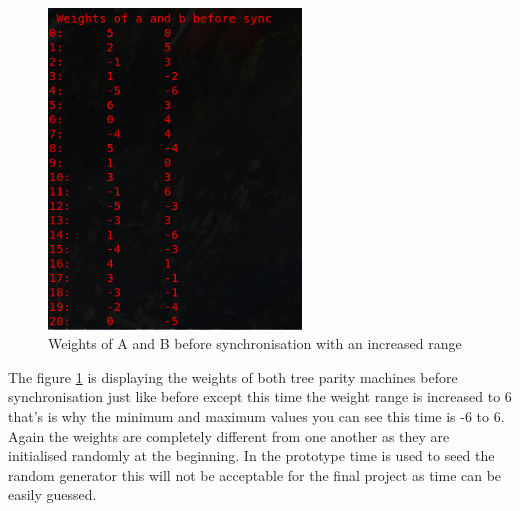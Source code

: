 \begin{figure}[!h]
  \centering
      \includegraphics[width=0.6\textwidth]{Figures/proto9.png}
  \caption[Weights of A and B before synchronisation with an increased range]{Weights of A and B before synchronisation with an increased range}
  \label{fig:prototype9}
\end{figure}
\FloatBarrier
The figure \ref{fig:prototype9} is displaying the weights of both tree parity machines before synchronisation just like before except this time the weight range is increased to 6 that's is why the minimum and maximum values you can see this time is -6 to 6. Again the weights are completely different from one another as they are initialised randomly at the beginning. In the prototype time is used to seed the random generator this will not be acceptable for the final project as time can be easily guessed. 


